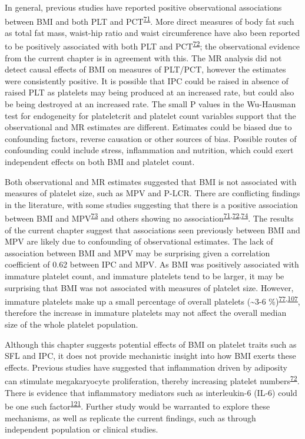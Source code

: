 \documentclass[11pt,twoside]{bristolthesis}
\begin{document}
In general, previous studies have reported positive observational associations between BMI and both PLT and PCT\textsuperscript{\protect\hyperlink{ref-Furuncuoglu2016}{71}}. More direct measures of body fat such as total fat mass, waist-hip ratio and waist circumference have also been reported to be positively associated with both PLT and PCT\textsuperscript{\protect\hyperlink{ref-Han2018a}{72}}; the observational evidence from the current chapter is in agreement with this. The MR analysis did not detect causal effects of BMI on measures of PLT/PCT, however the estimates were consistently positive. It is possible that IPC could be raised in absence of raised PLT as platelets may being produced at an increased rate, but could also be being destroyed at an increased rate. The small P values in the Wu-Hausman test for endogeneity for plateletcrit and platelet count variables support that the observational and MR estimates are different. Estimates could be biased due to confounding factors, reverse causation or other sources of bias. Possible routes of confounding could include stress, inflammation and nutrition, which could exert independent effects on both BMI and platelet count.

Both observational and MR estimates suggested that BMI is not associated with measures of platelet size, such as MPV and P-LCR. There are conflicting findings in the literature, with some studies suggesting that there is a positive association between BMI and MPV\textsuperscript{\protect\hyperlink{ref-Coban2005}{73}} and others showing no association\textsuperscript{\protect\hyperlink{ref-Furuncuoglu2016}{71},\protect\hyperlink{ref-Han2018a}{72},\protect\hyperlink{ref-Heffron2018}{74}}. The results of the current chapter suggest that associations seen previously between BMI and MPV are likely due to confounding of observational estimates. The lack of association between BMI and MPV may be surprising given a correlation coefficient of 0.62 between IPC and MPV. As BMI was positively associated with immature platelet count, and immature platelets tend to be larger, it may be surprising that BMI was not associated with measures of platelet size. However, immature platelets make up a small percentage of overall platelets (\textasciitilde3-6 \%)\textsuperscript{\protect\hyperlink{ref-Ibrahim2014}{77},\protect\hyperlink{ref-Bernlochner2015a}{107}}, therefore the increase in immature platelets may not affect the overall median size of the whole platelet population.

Although this chapter suggests potential effects of BMI on platelet traits such as SFL and IPC, it does not provide mechanistic insight into how BMI exerts these effects. Previous studies have suggested that inflammation driven by adiposity can stimulate megakaryocyte proliferation, thereby increasing platelet numbers\textsuperscript{\protect\hyperlink{ref-Han2018a}{72}}. There is evidence that inflammatory mediators such as interleukin-6 (IL-6) could be one such factor\textsuperscript{\protect\hyperlink{ref-Kaser2001}{121}}. Further study would be warranted to explore these mechanisms, as well as replicate the current findings, such as through independent population or clinical studies.
\end{document}
